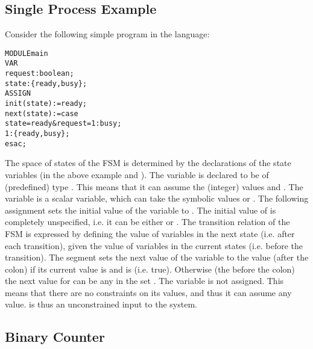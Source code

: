 \subsection{Single Process Example}
\label{Mutual Exclusion Example}

Consider the following simple program in the \nusmv language:
\noindent
\begin{alltt}
MODULE main
VAR
  request : boolean;
  state   : \{ready, busy\};
ASSIGN
  init(state) := ready;
  next(state) := case
                   state = ready & request = 1 : busy;
                   1                        : \{ready, busy\};
                 esac;
\end{alltt}

The space of states of the
FSM is determined by the declarations of the state
variables (in the above example  and ). The
variable  is declared to be of (predefined) type
.  This means that it can assume the (integer) values
 and . The variable  is a scalar variable,
which can take the symbolic values  or .
The following assignment sets the initial value of the variable
 to . The initial value of  is
completely unspecified, i.e. it can be either  or .
The transition relation of the FSM is expressed by defining
the value of variables in the next state (i.e. after each transition),
given the value of variables in the current states (i.e. before the
transition). The  segment sets the next value of the variable
 to the value  (after the colon) if its current
value is  and  is  (i.e. true).
Otherwise (the  before the colon) the next value for
 can be any in the set .
The variable  is not assigned. This means that there are
no constraints on its values, and thus it can assume any value.
 is thus an unconstrained input to the system.



\subsection{Binary Counter}
\label{Binary Counter Example}

